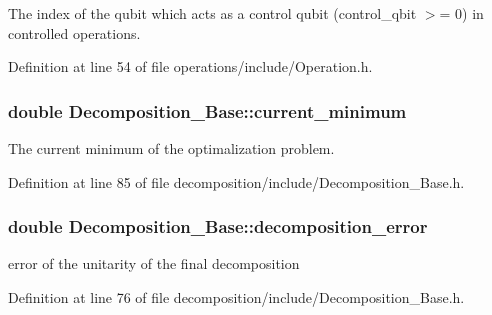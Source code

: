 The index of the qubit which acts as a control qubit (control\+\_\+qbit $>$= 0) in controlled operations. 



Definition at line 54 of file operations/include/\+Operation.\+h.

\subsubsection[{\texorpdfstring{current\+\_\+minimum}{current_minimum}}]{\setlength{\rightskip}{0pt plus 5cm}double Decomposition\+\_\+\+Base\+::current\+\_\+minimum\hspace{0.3cm}{\ttfamily [protected]}}\hypertarget{class_decomposition___base_a7a8a6050c20f7965286792493a55d877}{}\label{class_decomposition___base_a7a8a6050c20f7965286792493a55d877}


The current minimum of the optimalization problem. 



Definition at line 85 of file decomposition/include/\+Decomposition\+\_\+\+Base.\+h.

\subsubsection[{\texorpdfstring{decomposition\+\_\+error}{decomposition_error}}]{\setlength{\rightskip}{0pt plus 5cm}double Decomposition\+\_\+\+Base\+::decomposition\+\_\+error\hspace{0.3cm}{\ttfamily [protected]}}\hypertarget{class_decomposition___base_a9b181a78ecfd103c9b233ddafa2defdd}{}\label{class_decomposition___base_a9b181a78ecfd103c9b233ddafa2defdd}


error of the unitarity of the final decomposition 



Definition at line 76 of file decomposition/include/\+Decomposition\+\_\+\+Base.\+h.

